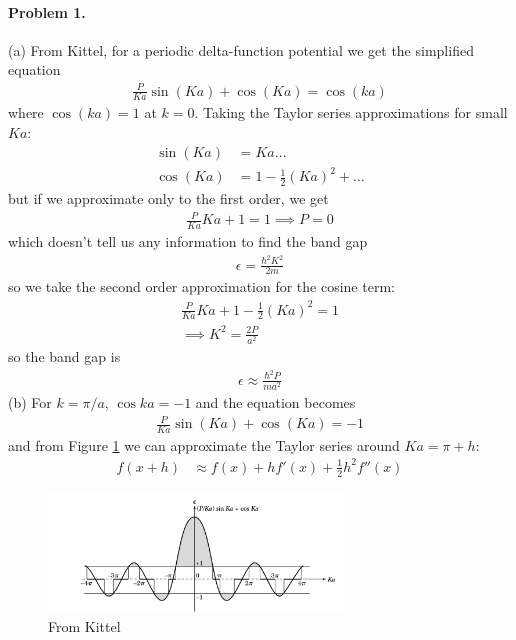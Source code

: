 \documentclass[../main.tex]{subfiles}
\begin{document}
\pagestyle{fancy}

\renewcommand\thefigure{\arabic{figure}} 

\paragraph*{Problem 1.} (a)
From Kittel, for a periodic delta-function potential we get the simplified equation
\begin{align*}
    \frac{P}{Ka} \sin(Ka) + \cos(Ka) = \cos(ka)
\end{align*}
where $\cos(ka) = 1$ at $k = 0$. Taking the Taylor series approximations for small $Ka$:
\begin{align*}
    \sin(Ka) &= Ka \dots \\
    \cos(Ka) &= 1 - \frac{1}{2} (Ka)^2 + \dots
\end{align*}
but if we approximate only to the first order, we get
\begin{align*}
    \frac{P}{Ka} Ka + 1 = 1 \implies P = 0
\end{align*}
which doesn't tell us any information to find the band gap
\begin{align*}
    \epsilon = \frac{\hbar^2 K^2}{2m}
\end{align*}
so we take the second order approximation for the cosine term:
\begin{align*}
    \frac{P}{Ka} Ka + 1 - \frac{1}{2} (Ka)^2 = 1 \\
    \implies K^2 = \frac{2P}{a^2}
\end{align*}
so the band gap is
\begin{align*}
    \epsilon \approx \frac{\hbar^2 P}{ma^2}
\end{align*}
(b) For $k = \pi/a$, $\cos{ka} = -1$ and the equation becomes
\begin{align*}
    \frac{P}{Ka} \sin(Ka) + \cos(Ka) = -1
\end{align*}
and from Figure \ref{hw3_1} we can approximate the Taylor series around $Ka = \pi + h$:
\begin{align*}
    f(x + h) &\approx f(x) + h f'(x) + \frac{1}{2} h^2 f''(x)
\end{align*} 
\begin{figure}[ht]
    \centering
    \includegraphics[width=0.7\textwidth]{hw3_1.png}
    \caption{From Kittel}
    \label{hw3_1}
\end{figure}
\end{document}
